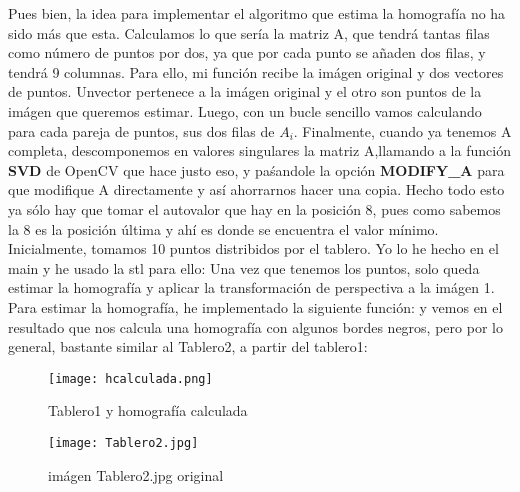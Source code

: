 Pues bien, la idea para implementar el algoritmo que estima la homografía no ha sido más que esta. Calculamos
lo que sería la matriz A, que tendrá tantas filas como número de puntos por dos, ya que por cada punto se añaden dos filas,
y tendrá 9 columnas. \newline
Para ello, mi función recibe la imágen original y dos vectores de puntos. Unvector pertenece a la imágen original y el otro son puntos
de la imágen que queremos estimar. \newline
 Luego, con un bucle sencillo vamos calculando para cada pareja de puntos, sus dos filas de $A_{i}$. Finalmente, cuando
ya tenemos A completa, descomponemos en valores singulares la matriz A,llamando a la función \textbf{SVD} de OpenCV que hace justo eso,
y paśandole la opción \textbf{MODIFY\_A} para que modifique A directamente y así ahorrarnos hacer una copia. \newline
Hecho todo esto ya sólo hay que tomar el autovalor que hay en la posición 8, pues como sabemos
la 8 es la posición última y ahí es donde se encuentra el valor mínimo. \newline
Inicialmente, tomamos 10 puntos distribidos por el tablero. Yo lo he hecho en el main y he usado la stl para ello:
Una vez que tenemos los puntos, solo queda estimar la homografía y aplicar la transformación de perspectiva a la imágen 1.
Para estimar la homografía, he implementado la siguiente función:
y vemos en el resultado que nos calcula una homografía con algunos bordes negros, pero por lo general, bastante similar al Tablero2, a partir
del tablero1:
\begin{figure}[H] %
\centering
\texttt{[image: hcalculada.png]}  %
\label{figura1}
\caption{Tablero1 y homografía calculada  }
\end{figure}

\begin{figure}[H] %
\centering
\texttt{[image: Tablero2.jpg]}  %
\label{figura1}
\caption{imágen Tablero2.jpg original}
\end{figure}




